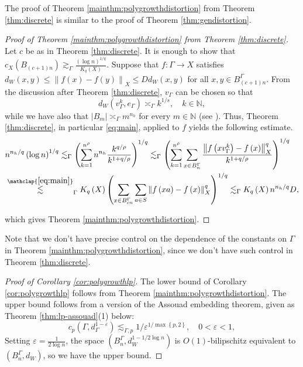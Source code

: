 \documentclass[11pt,reqno]{amsart}
\newcommand{\1}{\mathbf 1}
\begin{document}
The proof of Theorem \ref{mainthm:polygrowthdistortion} from Theorem \ref{thm:discrete} is similar to the proof of Theorem \ref{thm:gendistortion}.
\begin{proof}[Proof of Theorem \ref{mainthm:polygrowthdistortion} from Theorem \ref{thm:discrete}]
Let $c$ be as in Theorem \ref{thm:discrete}. It is enough to show that $c_X\left(B_{\left(c+1\right)n}\right)\gtrsim_\Gamma \frac{\left(\log n\right)^{1/q}}{K_q\left(X\right)}$.
Suppose that $f:\Gamma\to X$ satisfies $d_{W}\left(x,y\right)\le \left\|f\left(x\right)-f\left(y\right)\right\|_X\le D d_W\left(x,y\right)$ for all $x,y\in B^\Gamma_{\left(c+1\right)n}$. From the discussion after Theorem \ref{thm:discrete}, $v_\Gamma$ can be chosen so that
\[
d_W\left(v_\Gamma^k,e_\Gamma\right)\asymp_\Gamma k^{1/s} ,\quad k\in \mathbb{N},
\]
while we have also that $\left|B_m\right|\asymp_\Gamma m^{n_h}$ for every $m\in \mathbb{N}$ (see \cite[Theorem 1.1]{breuillard2012nilpotent}). Thus, Theorem \ref{thm:discrete}, in particular \eqref{eq:main}, applied to $f$ yields the following estimate.
\begin{align*}
&n^{n_h/q}\left(\log n\right)^{1/q}\lesssim_\Gamma
\left(\sum_{k=1}^{n^\rho} n^{n_h}\frac{k^{q/\rho}}{k^{1+q/\rho}}\right)^{1/q}\lesssim_\Gamma 
\left(\sum_{k=1}^{n^\rho}\sum_{x\in B^\Gamma_n}\frac{ \left\|f\left(xv_\Gamma^k\right)-f\left(x\right)\right\|_X^q}{k^{1+q/\rho}}\right)^{1/q}\\
&\stackrel{\mathclap{\eqref{eq:main}}}{\lesssim}_{\Gamma}
K_q\left(X\right)\left( \sum_{x\in B^\Gamma_{cn}} \sum_{a\in S}\left\|f\left(xa\right)-f\left(x\right)\right\|^q_X\right)^{1/q}
\lesssim_\Gamma K_q\left(X\right) n^{n_h/q}D,
\end{align*}

which gives Theorem \ref{mainthm:polygrowthdistortion}.
\end{proof}
Note that we don't have precise control on the dependence of the constants on $\Gamma$ in Theorem \ref{mainthm:polygrowthdistortion}, since we don't have such control in Theorem \ref{thm:discrete}.

\begin{proof}[Proof of Corollary \ref{cor:polygrowthlp}]
The lower bound of Corollary \ref{cor:polygrowthlp} follows from Theorem \ref{mainthm:polygrowthdistortion}. The upper bound follows from a version of the Assouad embedding theorem, given as Theorem \ref{thm:lp-assouad}(1) below:
\begin{equation*}
c_p\left(\Gamma,d_\Gamma^{1-\varepsilon}\right)\lesssim_{\Gamma,p} 1/\varepsilon^{1/\max\left\{p,2\right\}},\quad 0<\varepsilon<1,
\end{equation*}
Setting $\varepsilon=\frac{1}{2\log n}$, the space $\left(B^\Gamma_n,d_W^{1-1/2\log n}\right)$ is $O\left(1\right)$-bilipschitz equivalent to $\left(B^\Gamma_n,d_W\right)$, so we have the upper bound.
\end{proof}
\end{document}
